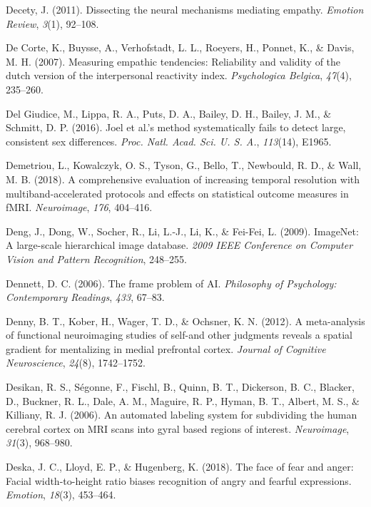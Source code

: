 \documentclass[11pt,american,a4paper,oneside,]{memoir} %
\begin{document}
\leavevmode\hypertarget{ref-decety2011dissecting}{}%
Decety, J. (2011). Dissecting the neural mechanisms mediating empathy. \emph{Emotion Review}, \emph{3}(1), 92--108.

\leavevmode\hypertarget{ref-de2007measuring}{}%
De Corte, K., Buysse, A., Verhofstadt, L. L., Roeyers, H., Ponnet, K., \& Davis, M. H. (2007). Measuring empathic tendencies: Reliability and validity of the dutch version of the interpersonal reactivity index. \emph{Psychologica Belgica}, \emph{47}(4), 235--260.

\leavevmode\hypertarget{ref-Del_Giudice2016-ns}{}%
Del Giudice, M., Lippa, R. A., Puts, D. A., Bailey, D. H., Bailey, J. M., \& Schmitt, D. P. (2016). Joel et al.'s method systematically fails to detect large, consistent sex differences. \emph{Proc. Natl. Acad. Sci. U. S. A.}, \emph{113}(14), E1965.

\leavevmode\hypertarget{ref-Demetriou2018-xp}{}%
Demetriou, L., Kowalczyk, O. S., Tyson, G., Bello, T., Newbould, R. D., \& Wall, M. B. (2018). A comprehensive evaluation of increasing temporal resolution with multiband-accelerated protocols and effects on statistical outcome measures in fMRI. \emph{Neuroimage}, \emph{176}, 404--416.

\leavevmode\hypertarget{ref-Deng2009-bp}{}%
Deng, J., Dong, W., Socher, R., Li, L.-J., Li, K., \& Fei-Fei, L. (2009). ImageNet: A large-scale hierarchical image database. \emph{2009 IEEE Conference on Computer Vision and Pattern Recognition}, 248--255.

\leavevmode\hypertarget{ref-Dennett2006-el}{}%
Dennett, D. C. (2006). The frame problem of AI. \emph{Philosophy of Psychology: Contemporary Readings}, \emph{433}, 67--83.

\leavevmode\hypertarget{ref-denny2012meta}{}%
Denny, B. T., Kober, H., Wager, T. D., \& Ochsner, K. N. (2012). A meta-analysis of functional neuroimaging studies of self-and other judgments reveals a spatial gradient for mentalizing in medial prefrontal cortex. \emph{Journal of Cognitive Neuroscience}, \emph{24}(8), 1742--1752.

\leavevmode\hypertarget{ref-Desikan2006-gh}{}%
Desikan, R. S., Ségonne, F., Fischl, B., Quinn, B. T., Dickerson, B. C., Blacker, D., Buckner, R. L., Dale, A. M., Maguire, R. P., Hyman, B. T., Albert, M. S., \& Killiany, R. J. (2006). An automated labeling system for subdividing the human cerebral cortex on MRI scans into gyral based regions of interest. \emph{Neuroimage}, \emph{31}(3), 968--980.

\leavevmode\hypertarget{ref-Deska2018-hx}{}%
Deska, J. C., Lloyd, E. P., \& Hugenberg, K. (2018). The face of fear and anger: Facial width-to-height ratio biases recognition of angry and fearful expressions. \emph{Emotion}, \emph{18}(3), 453--464.
\end{document}
